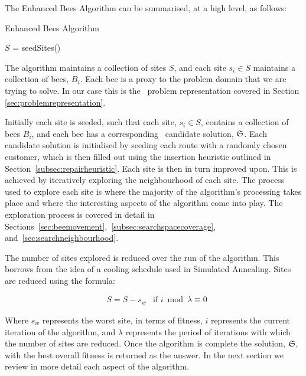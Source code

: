 The Enhanced Bees Algorithm can be summarised, at a high level, as follows:

\begin{algorithm}[H]
   \caption{Enhanced Bees Algorithm}
   $S$ = seedSites() \\

\end{algorithm}

The algorithm maintains a collection of sites $S$, and each site $s_i \in S$ maintains a collection of bees, $B_i$. Each bee is a proxy to the problem domain that we are trying to solve. In our case this is the \VRP\ problem representation covered in Section \ref{sec:problemrepresentation}.

Initially each site is seeded, such that each site, $s_i \in S$, contains a collection of bees $B_i$, and each bee has a corresponding \VRP\ candidate solution, $\mathfrak{S}$. Each candidate solution is initialised by seeding each route with a randomly chosen customer, which is then filled out using the insertion heuristic outlined in Section~\ref{subsec:repairheuristic}. Each site is then in turn improved upon. This is achieved by iteratively exploring the neighbourhood of each site. The process used to explore each site is where the majority of the algorithm's processing takes place and where the interesting aspects of the algorithm come into play. The exploration process is covered in detail in Sections~\ref{sec:beemovement},~\ref{subsec:searchspacecoverage}, and~\ref{sec:searchneighbourhood}.

The number of sites explored is reduced over the run of the algorithm. This borrows from the idea of a cooling schedule used in Simulated Annealing. Sites are reduced using the formula:

\begin{align}
   & S = S - s_w & \text{if $i \bmod{\lambda} \equiv 0$}
\end{align}

Where $s_w$ represents the worst site, in terms of fitness, $i$ represents the current iteration of the algorithm, and $\lambda$ represents the period of iterations with which the number of sites are reduced. Once the algorithm is complete the solution, $\mathfrak{S}$, with the best overall fitness is returned as the answer. In the next section we review in more detail each aspect of the algorithm.

